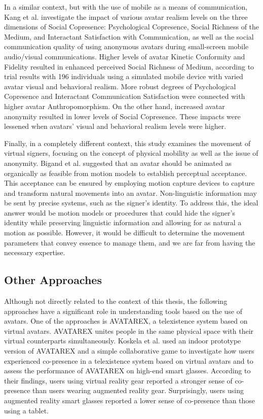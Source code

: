 In a similar context, but with the use of mobile as a means of communication, Kang et al. \cite{KAN13} investigate the impact of various avatar realism levels on the three dimensions of Social Copresence: Psychological Copresence, Social Richness of the Medium, and Interactant Satisfaction with Communication, as well as the social communication quality of using anonymous avatars during small-screen mobile audio/visual communications. Higher levels of avatar Kinetic Conformity and Fidelity resulted in enhanced perceived Social Richness of Medium, according to trial results with 196 individuals using a simulated mobile device with varied avatar visual and behavioral realism. More robust degrees of Psychological Copresence and Interactant Communication Satisfaction were connected with higher avatar Anthropomorphism. On the other hand, increased avatar anonymity resulted in lower levels of Social Copresence. These impacts were lessened when avatars' visual and behavioral realism levels were higher.

Finally, in a completely different context, this study examines the movement of virtual signers, focusing on the concept of physical mobility as well as the issue of anonymity. Bigand et al. \cite{BIG19} suggested that an avatar should be animated as organically as feasible from motion models to establish perceptual acceptance. This acceptance can be ensured by employing motion capture devices to capture and transform natural movements into an avatar. Non-linguistic information may be sent by precise systems, such as the signer's identity. To address this, the ideal answer would be motion models or procedures that could hide the signer's identity while preserving linguistic information and allowing for as natural a motion as possible. However, it would be difficult to determine the movement parameters that convey essence to manage them, and we are far from having the necessary expertise.

\subsection{Other Approaches}
Although not directly related to the context of this thesis, the following approaches have a significant role in understanding tools based on the use of avatars. One of the approaches is AVATAREX, a telexistence system based on virtual avatars. AVATAREX unites people in the same physical space with their virtual counterparts simultaneously. Koskela et al. \cite{KOS18} used an indoor prototype version of AVATAREX and a simple collaborative game to investigate how users experienced co-presence in a telexistence system based on virtual avatars and to assess the performance of AVATAREX on high-end smart glasses. According to their findings, users using virtual reality gear reported a stronger sense of co-presence than users wearing augmented reality gear. Surprisingly, users using augmented reality smart glasses reported a lower sense of co-presence than those using a tablet.

